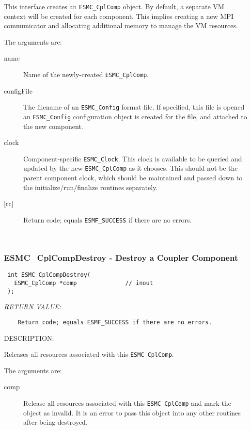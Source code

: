   
    This interface creates an {\tt ESMC\_CplComp} object. By default, a
    separate VM context will be created for each component.  This implies
    creating a new MPI communicator and allocating additional memory to
    manage the VM resources.
  
    The arguments are:
    \begin{description}
    \item[name]
      Name of the newly-created {\tt ESMC\_CplComp}.
    \item[configFile]
     The filename of an {\tt ESMC\_Config} format file. If specified, this file
     is opened an {\tt ESMC\_Config}  configuration object is created for the
     file, and attached to the new component. 
    \item[clock]
     Component-specific {\tt ESMC\_Clock}. This clock is available to be queried
     and updated by the new {\tt ESMC\_CplComp} as it chooses. This should not
     be the parent component clock, which should be maintained and passed down
     to the initialize/run/finalize routines separately. 
    \item[{[rc]}]
     Return code; equals {\tt ESMF\_SUCCESS} if there are no errors.
    \end{description}
   
 
\mbox{}\hrulefill\ 
 
\subsubsection [ESMC\_CplCompDestroy] {ESMC\_CplCompDestroy - Destroy a Coupler Component}


  
\begin{verbatim} int ESMC_CplCompDestroy(
   ESMC_CplComp *comp              // inout
 );\end{verbatim}{\em RETURN VALUE:}
\begin{verbatim}    Return code; equals ESMF_SUCCESS if there are no errors.\end{verbatim}
{\sf DESCRIPTION:\\ }


  
    Releases all resources associated with this {\tt ESMC\_CplComp}.
  
    The arguments are:
    \begin{description}
    \item[comp]
      Release all resources associated with this {\tt ESMC\_CplComp} and mark
      the object as invalid. It is an error to pass this object into any other
      routines after being destroyed. 
   \end{description}
   

